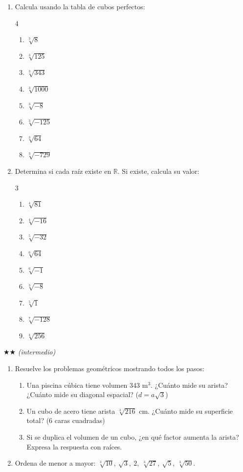\documentclass[11pt, letterpaper]{article}
\begin{document}
\begin{enumerate}[label=\textbf{\arabic*.}, leftmargin=*]
  \item Calcula usando la tabla de cubos perfectos:
  \begin{multicols}{4}
  \begin{enumerate}[label=\alph*)]
    \item $\sqrt[3]{8}$
    \item $\sqrt[3]{125}$
    \item $\sqrt[3]{343}$
    \item $\sqrt[3]{1000}$
    \item $\sqrt[3]{-8}$
    \item $\sqrt[3]{-125}$
    \item $\sqrt[3]{64}$
    \item $\sqrt[3]{-729}$
  \end{enumerate}
  \end{multicols}

  \item Determina si cada raíz existe en $\mathbb{R}$. Si existe, calcula su valor:
  \begin{multicols}{3}
  \begin{enumerate}[label=\alph*)]
    \item $\sqrt[4]{81}$
    \item $\sqrt[4]{-16}$
    \item $\sqrt[5]{-32}$
    \item $\sqrt[6]{64}$
    \item $\sqrt[6]{-1}$
    \item $\sqrt[3]{-8}$
    \item $\sqrt[5]{1}$
    \item $\sqrt[7]{-128}$
    \item $\sqrt[4]{256}$
  \end{enumerate}
  \end{multicols}
\end{enumerate}

$\bigstar\bigstar$ \textit{(intermedio)}

\begin{enumerate}[label=\textbf{\arabic*.}, leftmargin=*, resume]
  \item Resuelve los problemas geométricos mostrando todos los pasos:
  \begin{enumerate}[label=\alph*)]
    \item Una piscina cúbica tiene volumen 343 m$^3$. ¿Cuánto mide su arista? ¿Cuánto mide su diagonal espacial? ($d=a\sqrt{3}$)
    \item Un cubo de acero tiene arista $\sqrt[3]{216}$ cm. ¿Cuánto mide su superficie total? (6 caras cuadradas)
    \item Si se duplica el volumen de un cubo, ¿en qué factor aumenta la arista? Expresa la respuesta con raíces.
  \end{enumerate}

  \item Ordena de menor a mayor: $\sqrt[3]{10},\ \sqrt{3},\ 2,\ \sqrt[3]{27},\ \sqrt{5},\ \sqrt[3]{50}$.
\end{enumerate}
\end{document}

